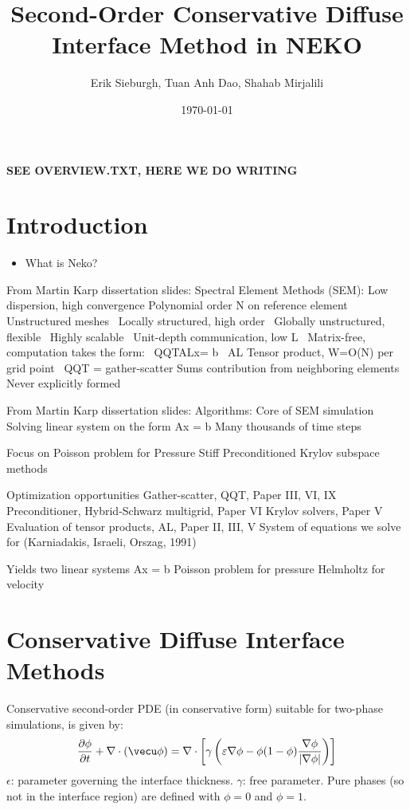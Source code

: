 \documentclass{article}
\title{Second-Order Conservative Diffuse Interface Method in NEKO}
\author{Erik Sieburgh, Tuan Anh Dao, Shahab Mirjalili}
\date{\today}
\begin{document}
\maketitle

\textbf{SEE OVERVIEW.TXT, HERE WE DO WRITING}

\section{Introduction}
\begin{itemize}
    \item What is Neko?
\end{itemize}

From Martin Karp dissertation slides:
Spectral Element Methods (SEM):
Low dispersion, high convergence
    Polynomial order N on reference element 
Unstructured meshes 
    Locally structured, high order 
    Globally unstructured, flexible 
Highly scalable 
Unit-depth communication, low L 
Matrix-free, computation takes the form: 
    QQTALx= b 
AL Tensor product, W=O(N) per grid point 
QQT = gather-scatter
    Sums contribution from neighboring elements
    Never explicitly formed
    
From Martin Karp dissertation slides:
Algorithms:
Core of SEM simulation
    Solving linear system on the form Ax = b
    Many thousands of time steps

Focus on Poisson problem for Pressure
    Stiff
    Preconditioned Krylov subspace methods

Optimization opportunities
    Gather-scatter, QQT, Paper III, VI, IX
    Preconditioner, Hybrid-Schwarz multigrid, Paper VI
    Krylov solvers, Paper V
    Evaluation of tensor products, AL, Paper II, III, V
System of equations we solve for (Karniadakis, Israeli, Orszag, 1991)

Yields two linear systems Ax = b
    Poisson problem for pressure
    Helmholtz for velocity


\section{Conservative Diffuse Interface Methods}
Conservative second-order PDE (in conservative form) suitable for two-phase simulations, is given by:
\begin{equation}
    \frac{\partial \phi}{\partial t} + \nabla \cdot \left(\vecu \phi\right) = \nabla \cdot \left[\gamma\left(\varepsilon \nabla \phi - \phi (1-\phi) \frac{\nabla \phi}{|\nabla \phi | } \right) \right]
    \label{eq:phase_field_model}
\end{equation}
$\epsilon$: parameter governing the interface thickness.
$\gamma$: free parameter.
Pure phases (so not in the interface region) are defined with $\phi = 0$ and $ \phi = 1$.
\end{document}
